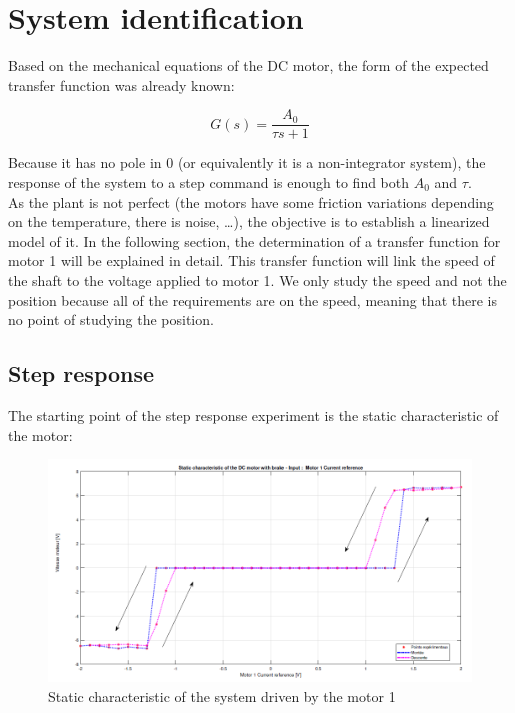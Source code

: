 \setcounter{secnumdepth}{2}

\chapter{System identification}
\label{section:identification}

Based on the mechanical equations of the DC motor, the form of the expected transfer function was already known:

\begin{equation}
    G(s) = \frac{A_0}{\tau s + 1}
    \label{eq:1_st_order_TF}
\end{equation}

Because it has no pole in $0$ (or equivalently it is a non-integrator system), the response of the system to a step
command is enough to find both $A_0$ and $\tau$.\\

As the plant is not perfect (the motors have some friction variations depending on the temperature, there is noise, 
\dots), the objective is to establish a linearized model of it. In the following section, the determination of a
transfer function for motor 1 will be explained in detail. This transfer function will link the speed of the shaft to
the voltage applied to motor 1. We only study the speed and not the position because all of the requirements are on
the speed, meaning that there is no point of studying the position.

\section{Step response}

The starting point of the step response experiment is the static characteristic of the motor:

\begin{figure}[H]
    \centering
    \includegraphics[height=\textheight/4]{Pictures/static_characteristic_motor_1.png}
    \caption{Static characteristic of the system driven by the motor 1}
    \label{fig:static_characteristic_motor_1}
\end{figure}

